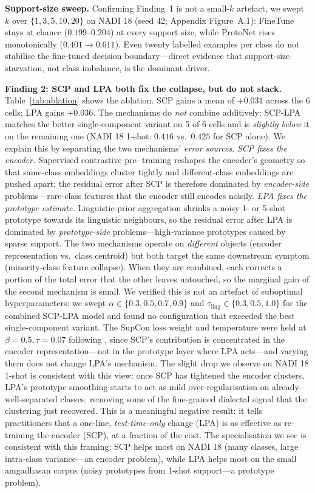 \documentclass[11pt]{article}
\begin{document}
\textbf{Support-size sweep.} Confirming Finding~1 is not
a small-$k$ artefact, we swept $k$ over
$\{1,3,5,10,20\}$ on NADI 18 (seed 42;
Appendix Figure~A.1): FineTune stays at chance
($0.199$--$0.204$) at every support size, while ProtoNet
rises monotonically ($0.401{\rightarrow}0.611$). Even
twenty labelled examples per class do not stabilise the
fine-tuned decision boundary---direct evidence that
support-size starvation, not class imbalance, is the
dominant driver.

\textbf{Finding 2: SCP and LPA both fix the collapse, but do
not stack.} Table~\ref{tab:ablation} shows the ablation. SCP
gains a mean of $+0.031$ across the 6 cells; LPA gains $+0.036$.
The mechanisms do \emph{not} combine additively: SCP-LPA
matches the better single-component variant on 5 of 6 cells
and is \emph{slightly below} it on the remaining one (NADI 18
1-shot: $0.416$ vs.\ $0.425$ for SCP alone). We explain this
by separating the two mechanisms' \emph{error sources}.
\emph{SCP fixes the encoder.} Supervised contrastive pre-
training reshapes the encoder's geometry so that same-class
embeddings cluster tightly and different-class embeddings are
pushed apart; the residual error after SCP is therefore
dominated by \emph{encoder-side} problems---rare-class
features that the encoder still encodes noisily. \emph{LPA
fixes the prototype estimate.} Linguistic-prior aggregation
shrinks a noisy 1- or 5-shot prototype towards its linguistic
neighbours, so the residual error after LPA is dominated by
\emph{prototype-side} problems---high-variance prototypes
caused by sparse support. The two mechanisms operate on
\emph{different} objects (encoder representation vs.\ class
centroid) but both target the same downstream symptom
(minority-class feature collapse). When they are combined,
each corrects a portion of the total error that the other
leaves untouched, so the marginal gain of the second
mechanism is small. We verified this is not an artefact of
suboptimal hyperparameters: we swept
$\alpha \in \{0.3, 0.5, 0.7, 0.9\}$ and
$\tau_{\mathrm{ling}} \in \{0.3, 0.5, 1.0\}$ for the combined SCP-LPA model
and found no configuration that exceeded the best single-component
variant. The SupCon loss weight and temperature were held at
$\beta{=}0.5, \tau{=}0.07$ following \citet{Khosla2020}, since
SCP's contribution is concentrated in the encoder
representation---not in the prototype layer where LPA acts---and
varying them does not change LPA's mechanism. The slight drop we observe on NADI 18
1-shot is consistent with this view: once SCP has tightened
the encoder clusters, LPA's prototype smoothing starts to act as
mild over-regularisation on already-well-separated classes,
removing some of the fine-grained dialectal signal that the
clustering just recovered. This is a meaningful negative
result: it tells practitioners that a one-line,
\emph{test-time-only} change (LPA) is as effective as
re-training the encoder (SCP), at a fraction of the cost. The
specialisation we see is consistent with this framing: SCP
helps most on NADI 18 (many classes, large intra-class
variance---an encoder problem), while LPA helps most on the
small amgadhasan corpus (noisy prototypes from 1-shot
support---a prototype problem).
\end{document}
